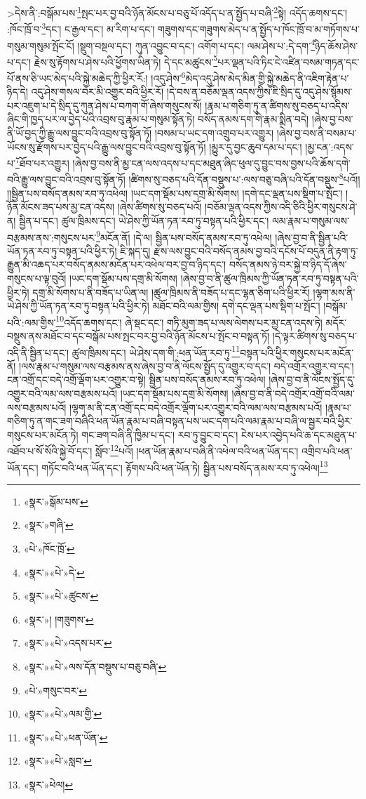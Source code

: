  >དེས་ནི་:བསྒོམ་པས་\footnote{«སྣར་»སྒོམ་པས་}སྤང་པར་བྱ་བའི་ཉོན་མོངས་པ་བཅུ་པོ་འདོད་པ་ན་སྤྱོད་པ་བཞི་\footnote{«སྣར་»གཞི་}སྟེ། འདོད་ཆགས་དང་། :ཁོང་ཁྲོ་བ་\footnote{«པེ་»ཁོང་ཁྲོ་}དང་། ང་རྒྱལ་དང་། མ་རིག་པ་དང་། གཟུགས་དང་གཟུགས་མེད་པ་ན་སྤྱོད་པ་ཁོང་ཁྲོ་བ་མ་གཏོགས་པ་གསུམ་གསུམ་སྤོང་ངོ། །སྡུག་བསྔལ་དང་། ཀུན་འབྱུང་བ་དང་། འགོག་པ་དང་། ལམ་ཤེས་པ་:དེ་དག་\footnote{«སྣར་»«པེ་»དེ་}ཉིད་ཆོས་ཤེས་པ་དང་། རྗེས་སུ་རྟོགས་པ་ཤེས་པའི་ཕྱོགས་ཡིན་ཏེ། དེ་དང་མཚུངས་\footnote{«སྣར་»«པེ་»ཚུངས་}པར་ལྡན་པའི་ཏིང་ངེ་འཛིན་བསམ་གཏན་དང་པོ་ནས་ཅི་ཡང་མེད་པའི་སྐྱེ་མཆེད་ཀྱི་ཕྱིར་རོ:། །འདུ་ཤེས་\footnote{«སྣར་»། །གཟུགས་}མེད་འདུ་ཤེས་མེད་མིན་གྱི་སྐྱེ་མཆེད་ནི་འཇིག་རྟེན་པ་ཉིད་དེ། འདུ་ཤེས་གསལ་བར་མི་འགྱུར་བའི་ཕྱིར་རོ། །དེ་བས་ན་བཅོམ་ལྡན་འདས་ཀྱིས་ཇི་སྲིད་དུ་འདུ་ཤེས་སྙོམས་པར་འཇུག་པ་དེ་སྲིད་དུ་ཀུན་ཤེས་པ་བཀག་གོ་ཞེས་གསུངས་སོ། །རྣམ་པ་གཅིག་ཏུ་ན་ཚིགས་སུ་བཅད་པ་འདིས་ཞིང་གི་ཁྱད་པར་ལ་བྱེད་པའི་འབྲས་བུ་རྣམ་པ་གསུམ་སྟོན་ཏེ། བསོད་ནམས་དག་གི་རྣམ་སྨིན་བདེ། །ཞེས་བྱ་བས་ནི་ཡོ་བྱད་ཀྱི་རྒྱུ་ལས་བྱུང་བའི་འབྲས་བུ་སྟོན་ཏོ། །བསམ་པ་ཡང་དག་འགྲུབ་པར་འགྱུར། །ཞེས་བྱ་བས་ནི་བསམ་པ་ཡོངས་སུ་རྫོགས་པར་བྱེད་པའི་རྒྱུ་ལས་བྱུང་བའི་འབྲས་བུ་སྟོན་ཏོ། །མྱུར་དུ་བྱང་ཆུབ་དམ་པ་དང་། །མྱ་ངན་:འདས་པ་\footnote{«སྣར་»«པེ་»འདས་པར་}ཐོབ་པར་འགྱུར། །ཞེས་བྱ་བས་ནི་མྱ་ངན་ལས་འདས་པ་དང་མཐུན་ཞིང་ཕུལ་དུ་བྱུང་བས་བྱས་པའི་ཆོས་དགེ་བའི་རྒྱུ་ལས་བྱུང་བའི་འབྲས་བུ་སྟོན་ཏོ། །ཚིགས་སུ་བཅད་པའི་དོན་བསྡུས་པ་:ལས་བཅུ་བཞི་པའི་དོན་བསྡུས་\footnote{«སྣར་»«པེ་»ལས་དོན་བསྡུས་པ་བཅུ་བཞི་}པའོ།། །།སྦྱིན་པས་བསོད་ནམས་རབ་ཏུ་འཕེལ། །ཡང་དག་སྡོམ་པས་དགྲ་མི་སོགས། །དགེ་དང་ལྡན་པས་སྡིག་པ་སྤོང་། །ཉོན་མོངས་ཟད་པས་མྱ་ངན་འདས། །ཞེས་ཚིགས་སུ་བཅད་པའོ། །བཅོམ་ལྡན་འདས་ཀྱིས་འདི་ཅིའི་ཕྱིར་གསུངས་ཤེ་ན། སྦྱིན་པ་དང་། ཚུལ་ཁྲིམས་དང་། ཡེ་ཤེས་ཀྱི་ཡོན་ཏན་རབ་ཏུ་བསྟན་པའི་ཕྱིར་དང་། ལམ་རྣམ་པ་གསུམ་ལས་བརྩམས་ནས་:གསུངས་པར་\footnote{«པེ་»གསུང་བར་}མངོན་ནོ། །དེ་ལ། སྦྱིན་པས་བསོད་ནམས་རབ་ཏུ་འཕེལ། །ཞེས་བྱ་བ་ནི་སྦྱིན་པའི་ཡོན་ཏན་རབ་ཏུ་བསྟན་པའི་ཕྱིར་ཏེ། ཇི་སྐད་དུ། རྫས་ལས་བྱུང་བའི་བསོད་ནམས་བྱ་བའི་དངོས་པོ་བདུན་ནི་རྟག་ཏུ་རྒྱུན་མི་འཆད་པར་བསོད་ནམས་མངོན་པར་འཕེལ་བར་བྱ་བ་ཉིད་དང་། བསོད་ནམས་ཉེ་བར་སྐྱེ་བ་ཉིད་དོ་ཞེས་གསུངས་པ་ལྟ་བུའོ། །ཡང་དག་སྡོམ་པས་དགྲ་མི་སོགས། །ཞེས་བྱ་བ་ནི་ཚུལ་ཁྲིམས་ཀྱི་ཡོན་ཏན་རབ་ཏུ་བསྟན་པའི་ཕྱིར་ཏེ། དགྲ་མི་སོགས་པ་ནི་བཟོད་པ་ཡིན་ལ། །ཚུལ་ཁྲིམས་ནི་བཟོད་པ་དང་ལྷན་ཅིག་པའི་ཕྱིར་རོ། །ལྷག་མས་ནི་ཡེ་ཤེས་ཀྱི་ཡོན་ཏན་རབ་ཏུ་བསྟན་པའི་ཕྱིར་ཏེ། མཐོང་བའི་ལམ་གྱིས། དགེ་དང་ལྡན་པས་སྡིག་པ་སྤོང་། །བསྒོམ་པའི་:ལམ་གྱིས་\footnote{«སྣར་»«པེ་»ལམ་གྱི་}འདོད་ཆགས་དང་། ཞེ་སྡང་དང་། གཏི་མུག་ཟད་པ་ལས་ལེགས་པར་མྱ་ངན་འདས་ཏེ། མདོར་བསྡུས་ནས་མཐོང་བ་དང་བསྒོམ་པས་སྤང་བར་བྱ་བའི་ཉོན་མོངས་པ་སྤོང་བ་བསྟན་ཏོ། །དེ་ལྟར་ཚིགས་སུ་བཅད་པ་འདི་ནི་སྦྱིན་པ་དང་། ཚུལ་ཁྲིམས་དང་། ཡེ་ཤེས་དག་གི་:ཕན་ཡོན་རབ་ཏུ་\footnote{«སྣར་»«པེ་»ཕན་ཡོན་}བསྟན་པའི་ཕྱིར་གསུངས་པར་མངོན་ནོ། །ལས་རྣམ་པ་གསུམ་ལས་བརྩམས་ནས་ཞེས་བྱ་བ་ནི་ལོངས་སྤྱོད་དུ་འགྱུར་བ་དང་། བདེ་འགྲོར་འགྱུར་བ་དང་། ངན་འགྲོ་དང་བདེ་འགྲོ་ལྡོག་པར་འགྱུར་བ་སྟེ། སྦྱིན་པས་བསོད་ནམས་རབ་ཏུ་འཕེལ། །ཞེས་བྱ་བ་ནི་ལོངས་སྤྱོད་དུ་འགྱུར་བའི་ལམ་ལས་བརྩམས་པའོ། །ཡང་དག་སྡོམ་པས་དགྲ་མི་སོགས། །ཞེས་བྱ་བ་ནི་བདེ་འགྲོར་འགྲོ་བའི་ལམ་ལས་བརྩམས་པའོ། །ལྷག་མ་ནི་ངན་འགྲོ་དང་བདེ་འགྲོར་ལྡོག་པར་འགྱུར་བའི་ལམ་ལས་བརྩམས་པའོ། །རྣམ་པ་གཅིག་ཏུ་ན་གང་ཟག་བཞིའི་ཕན་ཡོན་རྣམ་པ་བཞི་བསྟན་པས་ཡང་དག་པའི་ལམ་རྣམ་པ་བཞི་ལ་སྦྱར་བའི་ཕྱིར་གསུངས་པར་མངོན་ཏེ། གང་ཟག་བཞི་ནི་ཁྱིམ་པ་དང་། རབ་ཏུ་བྱུང་བ་དང་། ངེས་པར་འབྱེད་པའི་ཆ་དང་མཐུན་པ་འཐོབ་པ་སོ་སོའི་སྐྱེ་བོ་དང་། སློབ་\footnote{«སྣར་»«པེ་»སླབ་}པའོ། །ཕན་ཡོན་རྣམ་པ་བཞི་ནི་འཕེལ་བའི་ཕན་ཡོན་དང་། འགྲིབ་པའི་ཕན་ཡོན་དང་། གཏོང་བའི་ཕན་ཡོན་དང་། རྟོགས་པའི་ཕན་ཡོན་ཏེ། སྦྱིན་པས་བསོད་ནམས་རབ་ཏུ་འཕེལ།\footnote{«སྣར་»ཕེལ།} 
